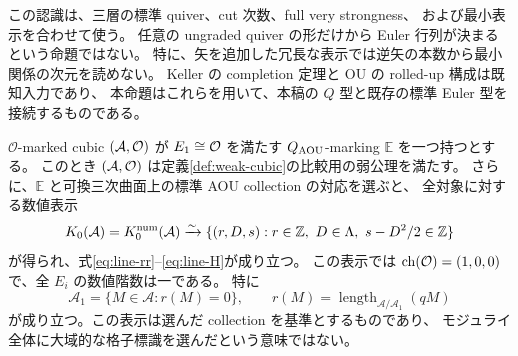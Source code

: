 \begin{remark}[仮定の必要な部分]
この認識は、三層の標準 quiver、cut 次数、full very strongness、
および最小表示を合わせて使う。
任意の ungraded quiver の形だけから Euler 行列が決まるという命題ではない。
特に、矢を追加した冗長な表示では逆矢の本数から最小関係の次元を読めない。
Keller の completion 定理と OU の rolled-up 構成は既知入力であり、
本命題はこれらを用いて、本稿の $Q$ 型と既存の標準 Euler 型を接続するものである。
\end{remark}

\begin{corollary}
\label{cor:q-marking-numerical-inputs}
$\mathcal O$-marked cubic $(\mathcal A,\mathcal O)$ が
$E_1\cong\mathcal O$ を満たす $Q_{\rm AOU}$-marking $\mathbb E$ を一つ持つとする。
このとき $(\mathcal A,\mathcal O)$ は定義\ref{def:weak-cubic}の比較用の弱公理を満たす。
さらに、$\mathbb E$ と可換三次曲面上の標準 AOU collection の対応を選ぶと、
全対象に対する数値表示
\[
 K_0(\mathcal A)=K_0^{\rm num}(\mathcal A)
 \xrightarrow{\sim}
 \{(r,D,s):r\in\mathbb Z,\ D\in\Lambda,
                         \ s-D^2/2\in\mathbb Z\}
\]
が得られ、式\eqref{eq:line-rr}--\eqref{eq:line-H}が成り立つ。
この表示では $\operatorname{ch}(\mathcal O)=(1,0,0)$ で、全 $E_i$ の数値階数は一である。
特に
\[
 \mathcal A_1=\{M\in\mathcal A:r(M)=0\},\qquad
 r(M)=\operatorname{length}_{\mathcal A/\mathcal A_1}(qM)
\]
が成り立つ。この表示は選んだ collection を基準とするものであり、
モジュライ全体に大域的な格子標識を選んだという意味ではない。
\end{corollary}
